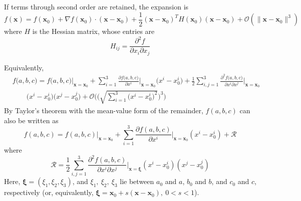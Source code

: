 \documentclass[english]{article}
\begin{document}
If terms through second order are retained, the expansion is 
\[
f\left(\boldsymbol{x}\right)=f\left(\boldsymbol{x}_{0}\right)+\nabla f\left(\boldsymbol{x}_{0}\right)\cdot\left(\boldsymbol{x}-\boldsymbol{x}_{0}\right)+\frac{1}{2}\left(\boldsymbol{x}-\boldsymbol{x}_{0}\right)^{T}H\left(\boldsymbol{x}_{0}\right)\left(\boldsymbol{x}-\boldsymbol{x}_{0}\right)+\mathcal{O}\left(\|\boldsymbol{x}-\boldsymbol{x}_{0}\|^{3}\right)
\]
 where $H$ is the Hessian matrix, whose entries are 
\[
H_{ij}=\frac{\partial^{2}f}{\partial x_{i}\partial x_{j}}
\]

Equivalently, 
\begin{align*}
 & f\biggl(a,b,c\biggr)=f\biggl(a,b,c\biggr)\Bigg|_{\boldsymbol{x}=\boldsymbol{x}_{0}}+\sum^{3}_{i=1}\frac{\partial f\biggl(a,b,c\biggr)}{\partial x^{i}}\Bigg|_{\boldsymbol{x}=\boldsymbol{x}_{0}}\biggl(x^{i}-x^{i}_{0}\biggr)+\frac{1}{2}\sum^{3}_{i,j=1}\frac{\partial^{2}f\biggl(a,b,c\biggr)}{\partial x^{i}\partial x^{j}}\Bigg|_{\boldsymbol{x}=\boldsymbol{x}_{0}}\\
 & \qquad\biggl(x^{i}-x^{i}_{0}\biggr)\biggl(x^{j}-x^{j}_{0}\biggr)+\mathcal{O}\biggl(\biggl(\sqrt{\sum^{3}_{i=1}\biggl(x^{i}-x^{i}_{0}\biggr)^{2}}\biggr)^{3}\biggr)
\end{align*}
 By Taylor's theorem with the mean-value form of the remainder, $f\left(a,b,c\right)$
can also be written as 
\[
f\left(a,b,c\right)=f\left(a,b,c\right)\Bigg|_{\boldsymbol{x}=\boldsymbol{x}_{0}}+\sum^{3}_{i=1}\frac{\partial f\left(a,b,c\right)}{\partial x^{i}}\Bigg|_{\boldsymbol{x}=\boldsymbol{x}_{0}}\left(x^{i}-x^{i}_{0}\right)+\mathcal{R}
\]
 where 
\[
\mathcal{R}=\frac{1}{2}\sum^{3}_{i,j=1}\frac{\partial^{2}f\left(a,b,c\right)}{\partial x^{i}\partial x^{j}}\Bigg|_{\boldsymbol{x}=\boldsymbol{\xi}}\left(x^{i}-x^{i}_{0}\right)\left(x^{j}-x^{j}_{0}\right)
\]
 Here, $\boldsymbol{\xi}=\left(\xi_{1},\xi_{2},\xi_{3}\right)$, and
$\xi_{1},\ \xi_{2},\ \xi_{3}$ lie between $a_{0}$ and $a$, $b_{0}$
and $b$, and $c_{0}$ and $c$, respectively (or, equivalently, $\boldsymbol{\xi}=\boldsymbol{x}_{0}+s\left(\boldsymbol{x}-\boldsymbol{x}_{0}\right),\ 0<s<1$).
\end{document}
